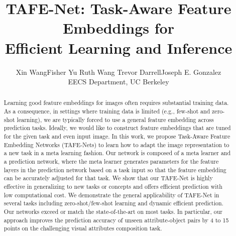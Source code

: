 \documentclass[10pt,twocolumn,letterpaper]{article}
\title{TAFE-Net: Task-Aware Feature Embeddings for \\ Efficient Learning and Inference}
\author{
  Xin Wang\quad Fisher Yu\quad 
  Ruth Wang\quad
  Trevor Darrell\quad Joseph E. Gonzalez \\
  EECS Department, UC Berkeley 
}
\newcommand{\model}{TAFE-Net\xspace}
\newcommand{\modelplural}{TAFE-Nets\xspace}
\begin{document}

\maketitle

\begin{abstract}
Learning good feature embeddings for images often requires substantial training data.
As a consequence, in settings where training data is limited (e.g., few-shot and zero-shot learning), we are typically forced to use a general feature embedding across prediction tasks.
Ideally, we would like to construct feature embeddings that are tuned for the given task and even input image.
In this work, we propose Task-Aware Feature Embedding Networks (\modelplural) to learn how to adapt the image representation to a new task in a meta learning fashion. 
Our network is composed of a meta learner and a prediction network, where the meta learner generates parameters for the feature layers in the prediction network based on a task input so that the feature embedding can be accurately adjusted
for that task.
We show that our \model is highly effective in generalizing to new tasks or concepts and offers efficient prediction with low computational cost. 
We demonstrate the general applicability of \model in several tasks including zero-shot/few-shot learning and dynamic efficient prediction. Our networks exceed or match the state-of-the-art on most tasks. In particular, our approach improves the prediction accuracy of unseen attribute-object pairs by 4 to 15 points on the challenging visual attributes composition task.
\end{abstract}
\end{document}
